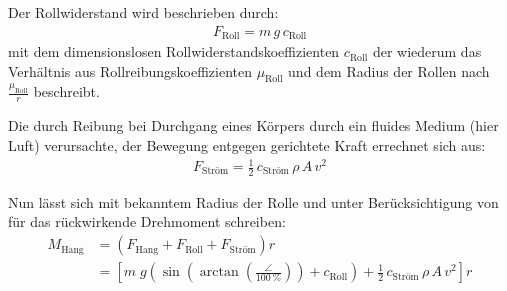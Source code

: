 	Der Rollwiderstand wird beschrieben durch:
	\begin{align}
		F_\text{Roll} = m \, g \, c_\text{Roll}
		\label{eq:rolling resistance}
	\end{align}
	mit dem dimensionslosen Rollwiderstandskoeffizienten \(c_\text{Roll}\) der wiederum das Verhältnis aus Rollreibungskoeffizienten \(\mu_\text{Roll}\) und dem Radius der Rollen nach \(\frac{\mu_\text{Roll}}{r}\) beschreibt.\par\medskip
	Die durch Reibung bei Durchgang eines Körpers durch ein fluides Medium (hier Luft) verursachte, der Bewegung entgegen gerichtete Kraft errechnet sich aus:
	\begin{align}
		F_\text{Ström} = \frac{1}{2} \, c_\text{Ström} \, \rho \, A \, v^2
		\label{eq:air drag}
	\end{align}

	Nun lässt sich mit bekanntem Radius der Rolle und unter Berücksichtigung von  für das rückwirkende Drehmoment schreiben:
	\begin{align}
		M_\text{Hang}	&= \left(F_\text{Hang} + F_\text{Roll} + F_\text{Ström}\right) r \nonumber \\
						&= \left[ m \; g \left( \sin\!\left(\arctan\!\left(\frac{\angle}{\qty{100}{\percent}}\right)\right) + c_\text{Roll} \right) + \frac{1}{2} \, c_\text{Ström} \, \rho \, A \, v^2 \right] r%
		\label{eq:incline plus roll plus drag torque}
	\end{align}
